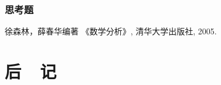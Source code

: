 \documentclass[utf8]{book}
\begin{document}
\subsection{思考题}









\appendix


\renewcommand\indexname{索~~引}
\printindex
{}

\backmatter


\begin{thebibliography}{参考文献}
 徐森林，薛春华编著 《数学分析》, 清华大学出版社, 2005.
\end{thebibliography}

\chapter{后~~记}

\begin{flushright}

\end{flushright}
\end{document}
